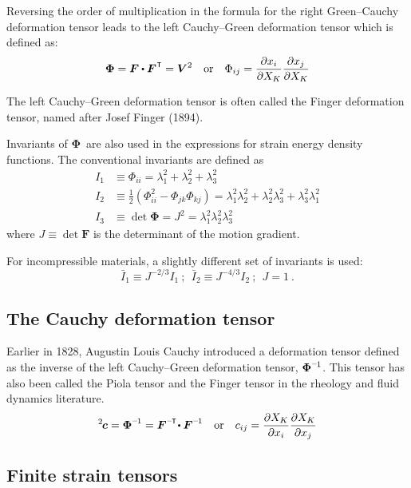 \begin{otherlanguage}{russian}
{Reversing the order of multiplication in the formula for the right Green–Cauchy deformation tensor leads to the left Cauchy\hbox{--}Green deformation tensor which is defined as:
\[ \displaystyle \bm{\Phi} = \bm{F} \dotp \bm{F}^{\hspace{.1ex}\T} = \bm{V}^{2}
\quad {\text{or}} \quad
\Phi_{ij}={\frac{\partial x_{i}}{\partial X_{K}}}{\frac{\partial x_{j}}{\partial X_{K}}} \]

The left Cauchy\hbox{--}Green deformation tensor is often called the Finger deformation tensor, named after Josef Finger (1894).

Invariants of ${\bm{\Phi}}\,\!$ are also used in the expressions for strain energy density functions. The conventional invariants are defined as
\[ \displaystyle {\begin{aligned}I_{1} & \equiv \Phi_{ii} = \lambda_{1}^{2}+\lambda_{2}^{2}+\lambda_{3}^{2}\\
I_{2} & \equiv {\tfrac {1}{2}} \left( \Phi_{ii}^{2} - \Phi_{jk}\Phi_{kj} \right) = \lambda_{1}^{2}\lambda_{2}^{2} + \lambda_{2}^{2}\lambda_{3}^{2}+\lambda_{3}^{2}\lambda_{1}^{2}\\
I_{3} & \equiv \det \bm{\Phi} = J^{2} = \lambda_{1}^{2}\lambda_{2}^{2}\lambda_{3}^{2}\end{aligned}} \]
where $J \equiv \det{\bm{F}}$ is the determinant of the motion gradient.

For incompressible materials, a slightly different set of invariants is used:
\[ \displaystyle {\bar {I}}_{1} \equiv J^{-2/3}I_{1}~;~~{\bar {I}}_{2} \equiv J^{-4/3}I_{2}~;~~J=1~. \]

\subsection*{The Cauchy deformation tensor}

Earlier in 1828, Augustin Louis Cauchy introduced a deformation tensor defined as the inverse of the left Cauchy\hbox{--}Green deformation tensor, $\bm{\Phi}^{\expminusone}\,\!$. This tensor has also been called the Piola tensor and the Finger tensor in the rheology and fluid dynamics literature.
\[ \displaystyle ^2\hspace{-0.2ex}\bm{c} = \bm{\Phi}^{\expminusone} = \bm{F}^{\expminusT} \!\dotp \bm{F}^{\expminusone}
\quad {\text{or}} \quad
c_{ij} = {\frac{\partial X_{K}}{\partial x_{i}}}{\frac{\partial X_{K}}{\partial x_{j}}} \]

\subsection*{Finite strain tensors}

}
\end{otherlanguage}
